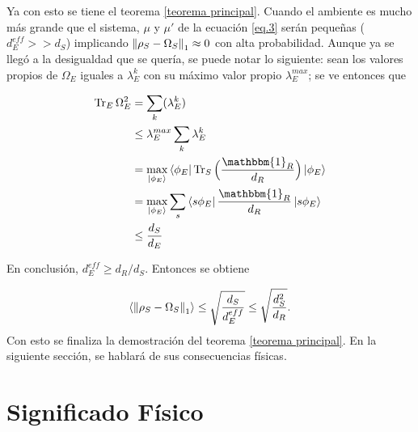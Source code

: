 Ya con esto se tiene el teorema \ref{teorema principal}. Cuando  el ambiente es mucho más grande que el sistema, $\mu$ y $\mu'$  de la ecuación \ref{eq.3} serán pequeñas ($d_{E}^{eff}>>d_{S}$) implicando $\norm{\rho_{S} -\Omega_{S}}_{1} \approx 0$ con alta probabilidad. Aunque ya se llegó a la desigualdad que se quería, se puede notar lo siguiente: sean los valores propios de $\Omega_{E}$ iguales a $\lambda_{E}^{k}$ con su máximo valor propio $\lambda_{E}^{max}$; se ve entonces que 

\begin{align*}
\Tr_{E} \Omega_{E}^{2} &= \sum_{k} (\lambda_{E}^{k})\\
&\leq \lambda_{E}^{max} \sum_{k} \lambda_{E}^{k}\\
&= \max_{\ket{\phi_{E}}} \bra{\phi_{E}} \Tr_{S} \Big( \frac{\mathbbm{1}_{R}}{d_{R}} \Big) \ket{\phi_{E}}\\
&= \max_{\ket{\phi_{E}}} \sum_{s} \bra{s \phi_{E}} \frac{\mathbbm{1}_{R}}{d_{R}} \ket{s \phi_{E}} \\
&\leq \frac{d_{S}}{d_{E}}	
\end{align*}

En conclusión, $d^{eff}_{E} \geq d_{R}/ d_{S}$. Entonces se obtiene

\begin{equation}
\langle \norm{\rho_{S} - \Omega_{S}}_{1} \rangle \leq \sqrt{\frac{d_{S}}{d_{E}^{eff}}} \leq  \sqrt{\frac{d_{S}^{2}}{d_{R}}}.
\end{equation}
Con esto se finaliza la demostración del teorema \ref{teorema principal}. En la siguiente sección, se hablará de sus consecuencias físicas.

\section{Significado Físico}

